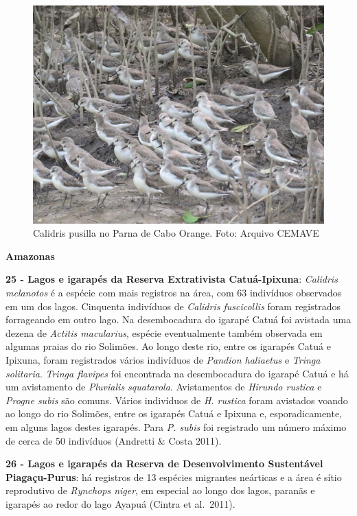\documentclass[
  oneside]{scrbook}
\begin{document}
\begin{figure}[H]

{\centering \includegraphics[width=0.75\linewidth]{imagens/cap07/Figura_7.4} 

}

\caption{Calidris pusilla no Parna de Cabo Orange. Foto: Arquivo CEMAVE}\label{fig:24}
\end{figure}

\textbf{Amazonas}

\textbf{25 - Lagos e igarapés da Reserva Extrativista Catuá-Ipixuna}: \emph{Calidris melanotos} é a espécie com mais registros na área, com 63 indivíduos observados em um dos lagos. Cinquenta indivíduos de \emph{Calidris fuscicollis} foram registrados forrageando em outro lago. Na desembocadura do igarapé Catuá foi avistada uma dezena de \emph{Actitis macularius}, espécie eventualmente também observada em algumas praias do rio Solimões. Ao longo deste rio, entre os igarapés Catuá e Ipixuna, foram registrados vários indivíduos de \emph{Pandion haliaetus} e \emph{Tringa solitaria}. \emph{Tringa flavipes} foi encontrada na desembocadura do igarapé Catuá e há um avistamento de \emph{Pluvialis squatarola}. Avistamentos de \emph{Hirundo rustica} e \emph{Progne subis} são comuns. Vários indivíduos de \emph{H. rustica} foram avistados voando ao longo do rio Solimões, entre os igarapés Catuá e Ipixuna e, esporadicamente, em alguns lagos destes igarapés. Para \emph{P. subis} foi registrado um número máximo de cerca de 50 indivíduos (Andretti \& Costa 2011).

\textbf{26 - Lagos e igarapés da Reserva de Desenvolvimento Sustentável Piagaçu-Purus}: há registros de 13 espécies migrantes neárticas e a área é sítio reprodutivo de \emph{Rynchops niger}, em especial ao longo dos lagos, paranãs e igarapés ao redor do lago Ayapuá (Cintra et al.~2011).
\end{document}
